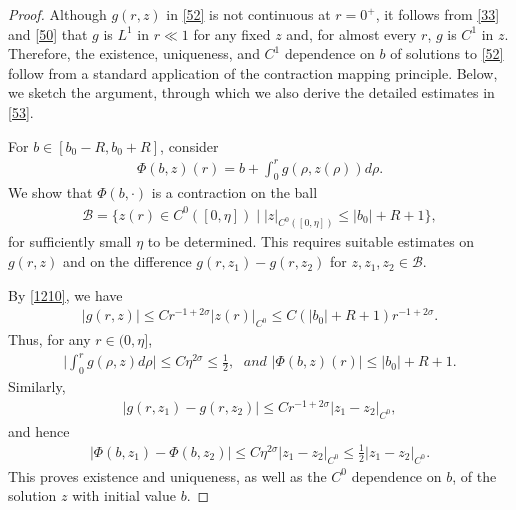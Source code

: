 \documentclass[12pt]{amsart}
\begin{document}
\begin{proof} 
Although $g(r, z)$ in \eqref{52} is not continuous at $r=0^+$, it follows from \eqref{33} and \eqref{50} that 
 $g$ is $L^1$ in $r \ll 1$ for any fixed $z$ and, for almost every $r$, $g$ is $C^1$ in $z$.
Therefore,
the existence, uniqueness, and $C^1$ dependence on $b$ of solutions to \eqref{52} follow from a standard application of the contraction mapping principle. Below, we sketch the argument, through which we also derive the detailed estimates in \eqref{53}. 

For $b \in [b_0-R, b_0+R]$, consider 
\begin{align}\label{55}
\Phi(b, z)(r)=b+\int_0^ rg(\rho, z(\rho))d\rho. 
\end{align}
We show that $\Phi (b, \cdot)$ is a contraction on the ball 
\begin{align}\label{56}
\mathcal B=\bigl \{z(r)\in C^0([0, \eta]) \mid |z|_{C^0([0, \eta])}\le |b_0| + R+1 \bigr\},
\end{align}
for sufficiently small $\eta$ to be determined. 
This requires suitable estimates on $g(r, z)$ and on the difference $g(r, z_1)-g(r,z_2)$ for $z, z_1, z_2\in \mathcal B$. 

By \eqref{1210}, we have 
\begin{align}
|g(r,z)|\le Cr^{-1+2\sigma}|z(r)|_{C^0}\le C (|b_0| + R+1)  r^{-1+2\sigma}. \label{57}
\end{align}
Thus, for any $r\in (0,\eta]$,
\begin{align}\label{57.1}
\bigl|\int_0^r g(\rho, z)d\rho\bigr|\le C\eta^{2\sigma} \le \frac{1}{2}, \; \textit{ and }|\Phi(b, z)(r)|\le |b_0| +R +1. 
\end{align}
Similarly, 
\begin{align*}
\bigl |g(r,z_1)-g(r,z_2)\bigr|\le Cr^{-1+2\sigma}|z_1-z_2|_{C^0}, 
\end{align*}
and hence
\begin{align*}
|\Phi(b, z_1)-\Phi(b, z_2)|\le C \eta^{2\sigma}|z_1-z_2|_{C^0}\le \frac 12|z_1-z_2|_{C^0}. 
\end{align*}
This proves existence and uniqueness, as well as the $C^0$ dependence on $b$, of the solution $z$ with initial value $b$.  %


\end{proof}
\end{document}

